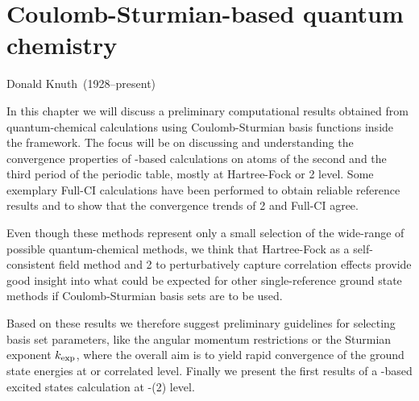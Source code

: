 \chapter{Coulomb-Sturmian-based quantum chemistry}
\label{ch:CSQChem}
{Donald Knuth~(1928--present)}

\newcommand{\limp}{l_\text{imp}}

\noindent
In this chapter we will discuss a preliminary computational results
obtained from quantum-chemical calculations using Coulomb-Sturmian
basis functions inside the \linebreak \molsturm framework.
The focus will be on discussing and understanding the convergence
properties of \CS-based calculations on atoms of
the second and the third period of the periodic table,
mostly at Hartree-Fock or {\MP}2 level.
Some exemplary Full-CI calculations have been performed
to obtain reliable reference results
and to show that the convergence trends of {\MP}2 and Full-CI agree.

Even though these methods represent only a small selection
of the wide-range of possible quantum-chemical methods,
we think that Hartree-Fock as a self-consistent field method
and {\MP}2 to perturbatively capture correlation effects
provide good insight into what could be expected
for other single-reference ground state methods
if Coulomb-Sturmian basis sets are to be used.

Based on these results we therefore suggest
preliminary guidelines for selecting \CS basis set parameters,
like the angular momentum restrictions or the Sturmian exponent $k_\text{exp}$,
where the overall aim is to yield rapid convergence
of the ground state energies at \HF or correlated level.
Finally we present the first results of a \CS-based
excited states calculation at \ADC-(2) level.






% 

